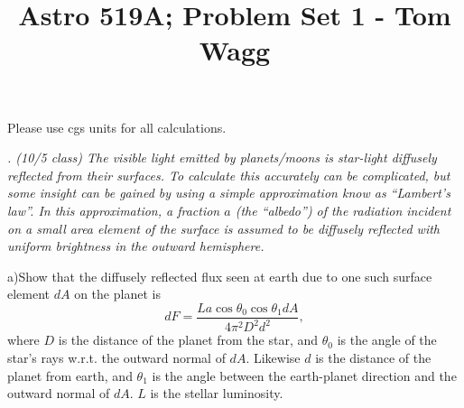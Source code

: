 \documentclass[12pt, letterpaper, twoside]{article}
\title{Astro 519A; Problem Set 1 - \textbf{Tom Wagg}}
\begin{document}
\maketitle

Please use cgs units for all calculations.


{\it {}.  {\it (10/5 class)} The visible light emitted by planets/moons is star-light diffusely reflected from their surfaces.  To calculate this accurately can be complicated, but some insight can be gained by using a simple approximation know as ``Lambert's law''.  In this approximation, a fraction $a$ (the ``albedo'') of the radiation incident on a small area element of the surface is assumed to be diffusely reflected with uniform brightness in the outward hemisphere.


 a)Show that the diffusely reflected flux seen at earth due to one such surface element $dA$ on the planet is
$$ dF = \frac{L a \cos \theta_0 \cos \theta_1 dA}{4\pi^2 D^2 d^2},$$
where $D$ is the distance of the planet from the star, and $\theta_0$ is the angle of the star's rays w.r.t. the outward normal of $dA$.  Likewise $d$ is the distance of the planet from earth, and $\theta_1$ is the angle between the earth-planet direction and the outward normal of $dA$.  $L$ is the stellar luminosity.}
\end{document}
